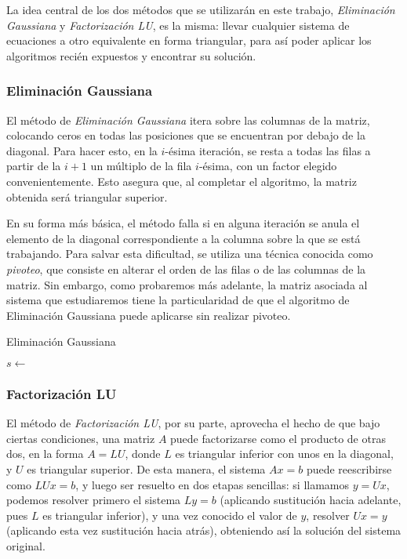     La idea central de los dos métodos que se utilizarán en este trabajo, \emph{Eliminación Gaussiana} y \emph{Factorización LU}, es la misma: llevar cualquier sistema de ecuaciones a otro equivalente en forma triangular, para así poder aplicar los algoritmos recién expuestos y encontrar su solución.

    \subsubsection{Eliminación Gaussiana}

      El método de \emph{Eliminación Gaussiana} itera sobre las columnas de la matriz, colocando ceros en todas las posiciones que se encuentran por debajo de la diagonal. Para hacer esto, en la $i$-ésima iteración, se resta a todas las filas a partir de la $i + 1$ un múltiplo de la fila $i$-ésima, con un factor elegido convenientemente. Esto asegura que, al completar el algoritmo, la matriz obtenida será triangular superior.

      En su forma más básica, el método falla si en alguna iteración se anula el elemento de la diagonal correspondiente a la columna sobre la que se está trabajando. Para salvar esta dificultad, se utiliza una técnica conocida como \emph{pivoteo}, que consiste en alterar el orden de las filas o de las columnas de la matriz. Sin embargo, como probaremos más adelante, la matriz asociada al sistema que estudiaremos tiene la particularidad de que el algoritmo de Eliminación Gaussiana puede aplicarse sin realizar pivoteo.

      \begin{algorithm}[H]
        \caption{Eliminación Gaussiana}
        $s \gets$  \;
      \end{algorithm}

    \subsubsection{Factorización LU}

      El método de \emph{Factorización LU}, por su parte, aprovecha el hecho de que bajo ciertas condiciones, una matriz $A$ puede factorizarse como el producto de otras dos, en la forma $A = LU$, donde $L$ es triangular inferior con unos en la diagonal, y $U$ es triangular superior. De esta manera, el sistema $Ax=b$ puede reescribirse como $LUx=b$, y luego ser resuelto en dos etapas sencillas: si llamamos $y=Ux$, podemos resolver primero el sistema $Ly=b$ (aplicando sustitución hacia adelante, pues $L$ es triangular inferior), y una vez conocido el valor de $y$, resolver $Ux=y$ (aplicando esta vez sustitución hacia atrás), obteniendo así la solución del sistema original.

